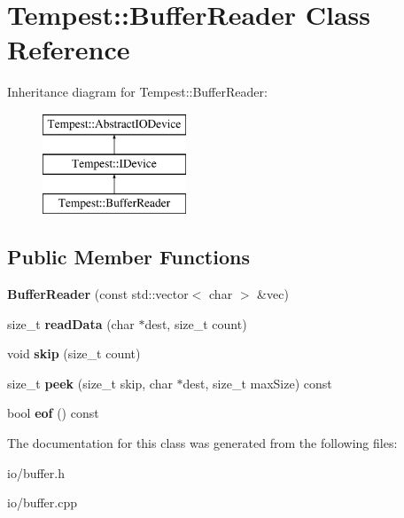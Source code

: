 \hypertarget{class_tempest_1_1_buffer_reader}{\section{Tempest\+:\+:Buffer\+Reader Class Reference}
\label{class_tempest_1_1_buffer_reader}
}
Inheritance diagram for Tempest\+:\+:Buffer\+Reader\+:\begin{figure}[H]
\begin{center}
\leavevmode
\includegraphics[height=3.000000cm]{class_tempest_1_1_buffer_reader}
\end{center}
\end{figure}
\subsection*{Public Member Functions}
\begin{DoxyCompactItemize}
\item 
\hypertarget{class_tempest_1_1_buffer_reader_af8af0816dcc15fc7de1cf6586019b392}{{\bfseries Buffer\+Reader} (const std\+::vector$<$ char $>$ \&vec)}\label{class_tempest_1_1_buffer_reader_af8af0816dcc15fc7de1cf6586019b392}

\item 
\hypertarget{class_tempest_1_1_buffer_reader_a4dbb9e185e267d93809c3f6989e43b1d}{size\+\_\+t {\bfseries read\+Data} (char $\ast$dest, size\+\_\+t count)}\label{class_tempest_1_1_buffer_reader_a4dbb9e185e267d93809c3f6989e43b1d}

\item 
\hypertarget{class_tempest_1_1_buffer_reader_ad1791db2c2146f029847a57f6afb0bb2}{void {\bfseries skip} (size\+\_\+t count)}\label{class_tempest_1_1_buffer_reader_ad1791db2c2146f029847a57f6afb0bb2}

\item 
\hypertarget{class_tempest_1_1_buffer_reader_a1b302e6a2c11bbd982a256c8348ab7ae}{size\+\_\+t {\bfseries peek} (size\+\_\+t skip, char $\ast$dest, size\+\_\+t max\+Size) const }\label{class_tempest_1_1_buffer_reader_a1b302e6a2c11bbd982a256c8348ab7ae}

\item 
\hypertarget{class_tempest_1_1_buffer_reader_abb197ac9453e3735abae619466bbff4a}{bool {\bfseries eof} () const }\label{class_tempest_1_1_buffer_reader_abb197ac9453e3735abae619466bbff4a}

\end{DoxyCompactItemize}


The documentation for this class was generated from the following files\+:\begin{DoxyCompactItemize}
\item 
io/buffer.\+h\item 
io/buffer.\+cpp\end{DoxyCompactItemize}
